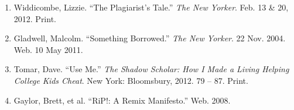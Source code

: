 \documentclass{writing}
\begin{document}
\begin{enumerate}
\def\labelenumi{\arabic{enumi}.}
\tightlist
\item
  Widdicombe, Lizzie. ``The Plagiarist's Tale.'' \emph{The New Yorker}.
  Feb. 13 \& 20, 2012. Print.
\item
  Gladwell, Malcolm. ``Something Borrowed.'' \emph{The New Yorker}. 22
  Nov. 2004. Web. 10 May 2011.
\item
  Tomar, Dave. ``Use Me.'' \emph{The Shadow Scholar: How I Made a Living
  Helping College Kids Cheat}. New York: Bloomsbury, 2012. 79 -- 87.
  Print.
\item
  Gaylor, Brett, et al. ``RiP!: A Remix Manifesto.'' Web. 2008.
\end{enumerate}
\end{document}
